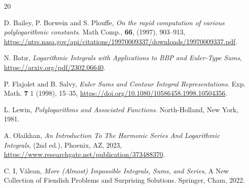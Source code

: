 \documentclass[11pt,reqno]{article}
\begin{document}
\begin{thebibliography}{20}
	

	
	 {\sc D. Bailey, P. Borwein and S. Plouffe}, {\it On the rapid computation of various polylogarithmic constants}. Math Comp., \textbf{66}, (1997), 903--913,
	\url{https://ntrs.nasa.gov/api/citations/19970009337/downloads/19970009337.pdf}.
	
	 {\sc N. Bat\i r}, {\it Logarithmic Integrals with Applications to BBP and Euler-Type Sums},
	\url{https://arxiv.org/pdf/2302.06640}.
	
	 {\sc P. Flajolet and B. Salvy}, {\it Euler Sums and Contour Integral Representations}. Exp. Math. \textbf{7} 1 (1998), 15--35,
	\url{https://doi.org/10.1080/10586458.1998.10504356}. 
	
	
	
	 {\sc L. Lewin}, \textit{Polylogarithms and Associated Functions}. North-Holland, New York, 1981.
	
	
	
	 {\sc A. Olaikhan}, {\it An Introduction To The Harmonic Series And Logarithmic Integrals}, (2nd ed.), Phoenix, AZ, 2023,
	\url{https://www.researchgate.net/publication/373488370}.
	
	
	{\sc C. I, V\u{a}lean}, {\it More (Almost) Impossible Integrals, Sums, and Series}, A New Collection of Fiendish Problems
	and Surprising Solutions. Springer, Cham, 2022. 
	
	
	
	
	
	
	
	
\end{thebibliography}
\end{document}
